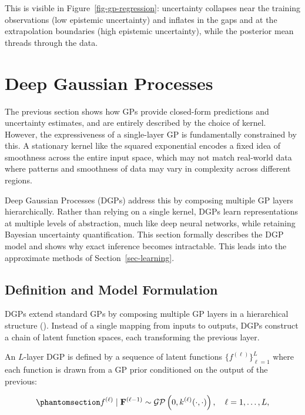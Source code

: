 \documentclass[
  letterpaper,
  DIV=11,
  numbers=noendperiod]{scrartcl}
\begin{document}
This is visible in Figure~\ref{fig-gp-regression}: uncertainty collapses
near the training observations (low epistemic uncertainty) and inflates
in the gaps and at the extrapolation boundaries (high epistemic
uncertainty), while the posterior mean threads through the data.

\section{Deep Gaussian Processes}\label{sec-dgps}

The previous section shows how GPs provide closed-form predictions and
uncertainty estimates, and are entirely described by the choice of
kernel. However, the expressiveness of a single-layer GP is
fundamentally constrained by this. A stationary kernel like the squared
exponential encodes a fixed idea of smoothness across the entire input
space, which may not match real-world data where patterns and smoothness
of data may vary in complexity across different regions.

Deep Gaussian Processes (DGPs) address this by composing multiple GP
layers hierarchically. Rather than relying on a single kernel, DGPs
learn representations at multiple levels of abstraction, much like deep
neural networks, while retaining Bayesian uncertainty quantification.
This section formally describes the DGP model and shows why exact
inference becomes intractable. This leads into the approximate methods
of Section~\ref{sec-learning}.

\subsection{Definition and Model
Formulation}\label{definition-and-model-formulation}

DGPs extend standard GPs by composing multiple GP layers in a
hierarchical structure (). Instead of a single mapping from inputs to outputs,
DGPs construct a chain of latent function spaces, each transforming the
previous layer.

An \(L\)-layer DGP is defined by a sequence of latent functions
\(\{f^{(\ell)}\}_{\ell=1}^{L}\) where each function is drawn from a GP
prior conditioned on the output of the previous:

\begin{equation}\phantomsection\label{eq-dgp_definition}{
f^{(\ell)} \mid \mathbf{F}^{(\ell-1)} \sim \mathcal{GP}\left(0, k^{(\ell)}(\cdot, \cdot)\right), \quad \ell = 1, \ldots, L,
}\end{equation}
\end{document}
